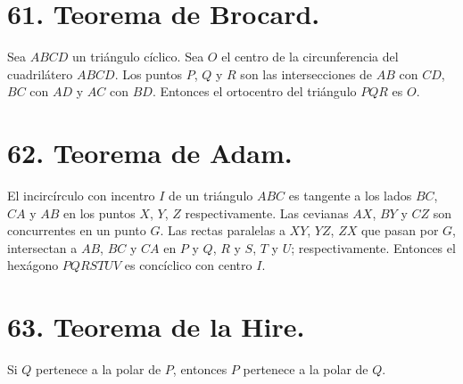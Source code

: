 \documentclass[12pt,a4paper, oneside]{book}
\begin{document}
\section{61. Teorema de Brocard.}
Sea $ABCD$ un triángulo cíclico. Sea $O$ el centro de la circunferencia del cuadrilátero $ABCD$. Los puntos $P$, $Q$ y $R$ son las intersecciones de $AB$ con $CD$, $BC$ con $AD$ y $AC$ con $BD$. Entonces el ortocentro del triángulo $PQR$ es $O$. 
\section{62. Teorema de Adam.}
El incircírculo con incentro $I$ de un triángulo $ABC$ es tangente a los lados $BC$, $CA$ y $AB$ en los puntos $X$, $Y$, $Z$ respectivamente. Las cevianas  $AX$, $BY$ y $CZ$ son concurrentes en un punto $G.$ Las rectas paralelas a $XY$, $YZ$, $ZX$ que pasan por $G$, intersectan a $AB$, $BC$ y $CA$ en $P$ y $Q$, $R$ y $S$, $T$ y $U$; respectivamente. Entonces el hexágono $PQRSTUV$ es concíclico con centro $I$.
\section{63. Teorema de la Hire.}
Si $Q$ pertenece a la polar de $P$, entonces $P$ pertenece a la polar de $Q$.
\end{document}
